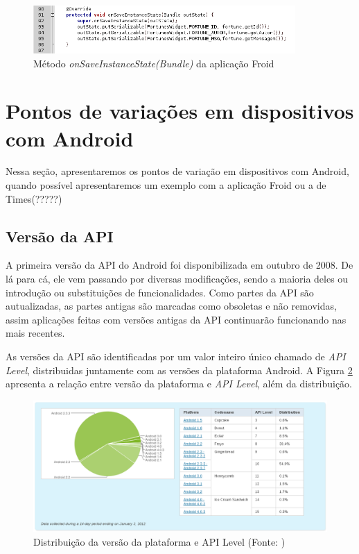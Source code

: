 \begin{figure}[h]
    \centering
    \includegraphics[width=10cm]{img/onSaveInstanceState}
    \caption{Método {\it onSaveInstanceState(Bundle)} da aplicação Froid}
    \label{onSaveInstanceState}
\end{figure}


\section{Pontos de variações em dispositivos com Android}

Nessa seção, apresentaremos os pontos de variação em dispositivos com Android,
quando possível apresentaremos um exemplo com a aplicação Froid ou a de Times(?????)

\subsection{Versão da API}

A primeira versão da API do Android foi disponibilizada em outubro de 2008. De lá 
para cá, ele vem passando por diversas modificações, sendo a maioria deles ou 
introdução ou substituições de funcionalidades. Como partes da API são autualizadas, 
as partes antigas são marcadas como obsoletas e não removidas, assim aplicações feitas
com versões antigas da API continuarão funcionando nas mais recentes.

As versões da API são identificadas por um valor inteiro único chamado de {\it API Level},
distribuidas juntamente com as versões da plataforma Android. A Figura \ref{api_level} 
apresenta a relação entre versão da plataforma e {\it API Level}, além da distribuição.

\begin{figure}[h]
    \centering
    \includegraphics[width=15cm]{img/api_level}
    \caption[Distribuição da versão da plataforma e API Level]{Distribuição da versão da plataforma e API Level (Fonte: \cite{platform_versions}) }
    \label{api_level}
\end{figure}

